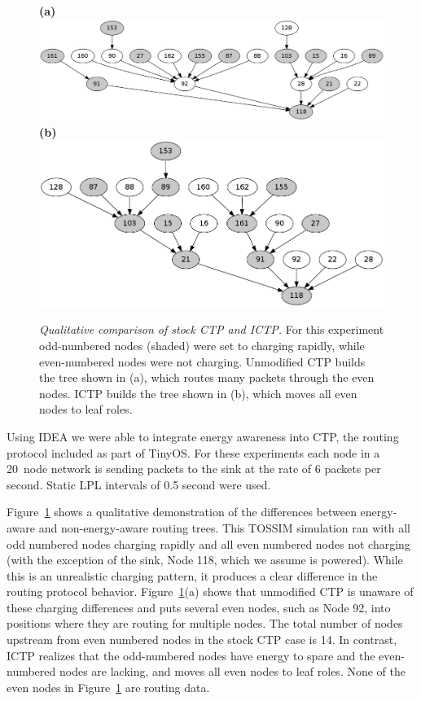 \documentclass{sig-alternate}
\begin{document}
\begin{figure}[t]
\begin{center}
\textbf{(a)}\\
\includegraphics[width=\hsize]{./figs/STOCK.png}\\
\textbf{(b)}\\
\includegraphics[width=\hsize]{./figs/ICTP.png}\\
\end{center}

\caption{\textit{Qualitative comparison of stock CTP and ICTP.} For this
experiment odd-numbered nodes (shaded) were set to charging rapidly, while
even-numbered nodes were not charging. Unmodified CTP builds the tree shown
in (a), which routes many packets through the even nodes. ICTP builds the
tree shown in (b), which moves all even nodes to leaf roles.}

\label{fig-ictpqualitative}
\end{figure}

Using IDEA we were able to integrate energy awareness into CTP, the routing
protocol included as part of TinyOS. For these experiments each node in a
20~node network is sending packets to the sink at the rate of 6 packets per
second. Static LPL intervals of 0.5 second were used. 

Figure~\ref{fig-ictpqualitative} shows a qualitative demonstration of the
differences between energy-aware and non-energy-aware routing trees. This
TOSSIM simulation ran with all odd numbered nodes charging rapidly and all
even numbered nodes not charging (with the exception of the sink, Node 118,
which we assume is powered). While this is an unrealistic charging pattern,
it produces a clear difference in the routing protocol behavior.
Figure~\ref{fig-ictpqualitative}(a) shows that unmodified CTP is unaware of
these charging differences and puts several even nodes, such as Node 92, into
positions where they are routing for multiple nodes. The total number of
nodes upstream from even numbered nodes in the stock CTP case is 14. In
contrast, ICTP realizes that the odd-numbered nodes have energy to spare and
the even-numbered nodes are lacking, and moves all even nodes to leaf roles.
None of the even nodes in Figure~\ref{fig-ictpqualitative} are routing data.
\end{document}
